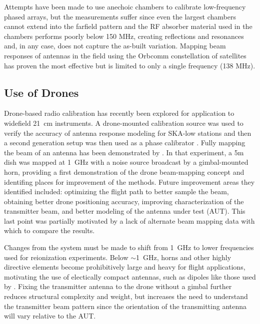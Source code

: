 \documentclass[preprint2,numberedappendix,tighten,twocolappendix]{aastex6}
\begin{document}
Attempts have been made to use anechoic chambers to calibrate low-frequency phased arrays, but the measurements suffer since even the largest chambers cannot extend into the farfield pattern and the RF absorber material used in the chambers performs poorly below 150 MHz, creating reflections and resonances and, in any case, does not capture the as-built variation. Mapping beam responses of antennas in the field using the Orbcomm constellation of satellites has proven the most effective \citep{2015RaSc...50..614N,2016:NebenHERAdish} but is limited to only a single frequency (138 MHz).  

\subsection{Use of Drones}

Drone-based radio calibration has recently been explored for application to widefield 21~cm instruments. A drone-mounted calibration source was used to verify the accuracy of antenna response modeling for SKA-low stations \cite{2014IAWPL..13..169V} and then a second generation setup was then used as a phase calibrator \citep{2015ExA....39..405P}.  Fully mapping the beam of an antenna has been demonstrated by \citet{2015PASP..127.1131C}.  In that experiment, a 5m dish was mapped at 1~GHz with a noise source broadcast by a gimbal-mounted horn, providing a first demonstration of the drone beam-mapping concept and identifing places for improvement of the methods.   Future improvement areas they identified included: optimizing the flight path to better sample the beam, obtaining better drone positioning accuracy, improving characterization of the transmitter beam, and better modeling of the antenna under test (AUT). This last point was partially motivated by a lack of alternate beam mapping data with which to compare the results. 

Changes from the \citet{2015PASP..127.1131C} system must be made to shift from 1~GHz to lower frequencies used for reionization experiments.  Below $\sim$1~GHz, horns and other highly directive elements become prohibitively large and heavy for flight applications, motivating the use of electically compact antennas, such as dipoles like those used by \citet{2014IAWPL..13..169V}.  Fixing the transmitter antenna to the drone without a gimbal further reduces structural complexity and weight, but increases the need to understand the transmitter beam pattern since the orientation of the transmitting antenna will vary relative to the AUT.
\end{document}

